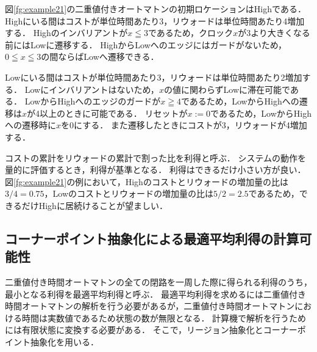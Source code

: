 \documentclass{ieicej}
\begin{document}
図\ref{fg:example21}の二重値付きオートマトンの初期ロケーションはHighである．
Highにいる間はコストが単位時間あたり3，リウォードは単位時間あたり4増加する．
Highのインバリアントが$x \leqq 3$であるため，クロック$x$が3より大きくなる前にはLowに遷移する．
HighからLowへのエッジにはガードがないため，$0 \leqq x \leqq 3$の間ならばLowへ遷移できる．

Lowにいる間はコストが単位時間あたり3，リウォードは単位時間あたり2増加する．
Lowにインバリアントはないため，$x$の値に関わらずLowに滞在可能である．
LowからHighへのエッジのガードが$x \geqq 4$であるため，LowからHighへの遷移は$x$が4以上のときに可能である．
リセットが$x := 0$であるため，LowからHighへの遷移時に$x$を0にする．
また遷移したときにコストが3，リウォードが4増加する．

コストの累計をリウォードの累計で割った比を利得と呼ぶ．
システムの動作を量的に評価するとき，利得が基準となる．
利得はできるだけ小さい方が良い．
図\ref{fg:example21}の例において，Highのコストとリウォードの増加量の比は$3/4 = 0.75$，Lowのコストとリウォードの増加量の比は$5/2 = 2.5$であるため，できるだけHighに居続けることが望ましい．






\subsection{コーナーポイント抽象化による最適平均利得の計算可能性}
二重値付き時間オートマトンの全ての閉路を一周した際に得られる利得のうち，最小となる利得を最適平均利得と呼ぶ．
最適平均利得を求めるには二重値付き時間オートマトンの解析を行う必要があるが，二重値付き時間オートマトンにおける時間は実数値であるため状態の数が無限となる．
計算機で解析を行うためには有限状態に変換する必要がある．
そこで，リージョン抽象化\cite{ta}とコーナーポイント抽象化\cite{pta}を用いる．
\end{document}
